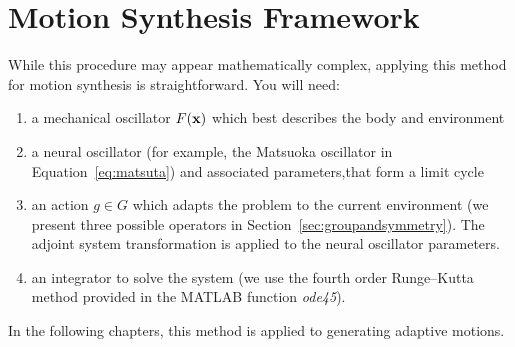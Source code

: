 \section{Motion Synthesis Framework}
\label{sec:procframe}
While this procedure may appear mathematically complex, applying this method for motion synthesis is straightforward. 
You will need:
\begin{enumerate}
\item a mechanical oscillator $F(\mathbf{x})$ which best describes the body and environment
\item a neural oscillator (for example, the Matsuoka oscillator in Equation~\ref{eq:matsuta}) and associated parameters,that form a limit cycle

\item an action $g \in G$ which adapts the problem to the current environment (we present three possible operators in Section~\ref{sec:groupandsymmetry}). 
The adjoint system transformation  is applied to the neural oscillator parameters.

\item an integrator to solve the system (we use the fourth order Runge--Kutta method provided in the {MATLAB} function \emph{ode45}).
\end{enumerate}
In the following chapters, this method is applied to generating adaptive motions.




